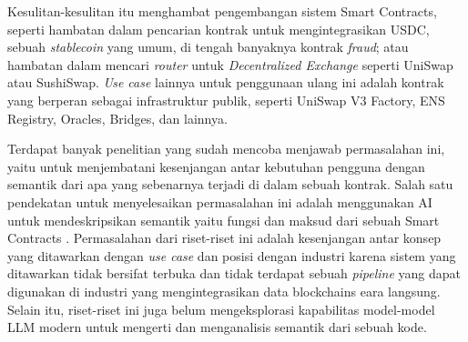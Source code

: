 Kesulitan-kesulitan itu menghambat pengembangan sistem Smart Contracts, seperti hambatan dalam pencarian kontrak untuk mengintegrasikan USDC, sebuah \textit{stablecoin} yang umum, di tengah banyaknya kontrak \textit{fraud}; atau hambatan dalam mencari \textit{router} untuk \textit{Decentralized Exchange} seperti UniSwap atau SushiSwap. \textit{Use case} lainnya untuk penggunaan ulang ini adalah kontrak yang berperan sebagai infrastruktur publik, seperti UniSwap V3 Factory, ENS Registry, Oracles, Bridges, dan lainnya.

Terdapat banyak penelitian yang sudah mencoba menjawab permasalahan ini, yaitu untuk menjembatani kesenjangan antar kebutuhan pengguna dengan semantik dari apa yang sebenarnya terjadi di dalam sebuah kontrak. Salah satu pendekatan untuk menyelesaikan permasalahan ini adalah menggunakan AI untuk mendeskripsikan semantik yaitu fungsi dan maksud dari sebuah Smart Contracts \parencite{zhang2021smart} \parencite{stan} \parencite{shi2021semantic} \parencite{shi2021semantic}. Permasalahan dari riset-riset ini adalah kesenjangan antar konsep yang ditawarkan dengan \textit{use case} dan posisi dengan industri karena sistem yang ditawarkan tidak bersifat terbuka dan tidak terdapat sebuah \textit{pipeline} yang dapat digunakan di industri yang mengintegrasikan data blockchains eara langsung. Selain itu, riset-riset ini juga belum mengeksplorasi kapabilitas model-model LLM modern untuk mengerti dan menganalisis semantik dari sebuah kode.



% 



% 
